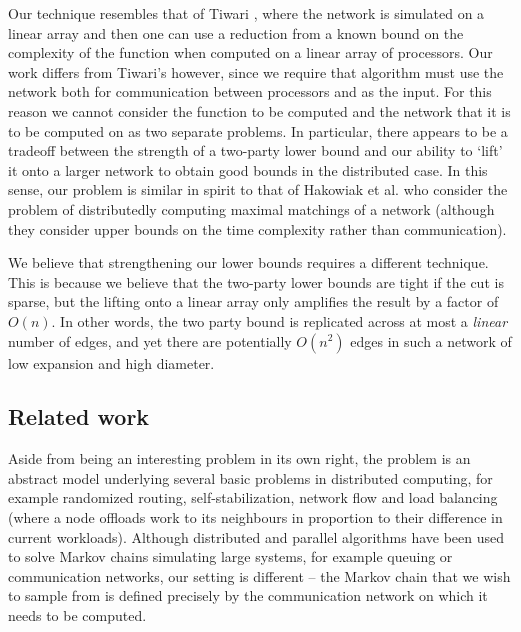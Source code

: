 \documentclass[twocolumn]{article}
\begin{document}
Our technique resembles that of Tiwari \cite{32978}, where the network is simulated on a linear array and then one can use a reduction from a known bound on the complexity of the function when computed on a linear array of processors. Our work differs from Tiwari's however, since we require that algorithm must use the network both for communication between processors and as the input. For this reason we cannot consider the function to be computed and the network that it is to be computed on as two separate problems. In particular, there appears to be a tradeoff between the strength of a two-party lower bound and our ability to `lift' it onto a larger network to obtain good bounds in the distributed case. In this sense, our problem is similar in spirit to that of Hakowiak et al. \cite{314705} who consider the problem of distributedly computing maximal matchings of a network (although they consider upper bounds on the time complexity rather than communication).

We believe that strengthening our lower bounds requires a different technique. This is because we believe that the two-party lower bounds are tight if the cut is sparse, but the lifting onto a linear array only amplifies the result by a factor of $O(n)$. In other words, the two party bound is replicated across at most a {\em linear} number of edges, and yet there are potentially $O(n^2)$ edges in such a network of low expansion and high diameter.

\subsection{Related work}

Aside from being an interesting problem in its own right, the problem is an
abstract model underlying several basic problems in distributed computing, for
example randomized routing, self-stabilization, network flow \cite{48689} and load balancing (where a node offloads work to its neighbours in proportion to their difference in current workloads). Although distributed and parallel algorithms have been used to solve Markov chains simulating large systems, for example queuing or communication networks, our setting is different -- the Markov chain that we wish to sample from is defined precisely by the communication network on which it needs to be computed.
\end{document}
